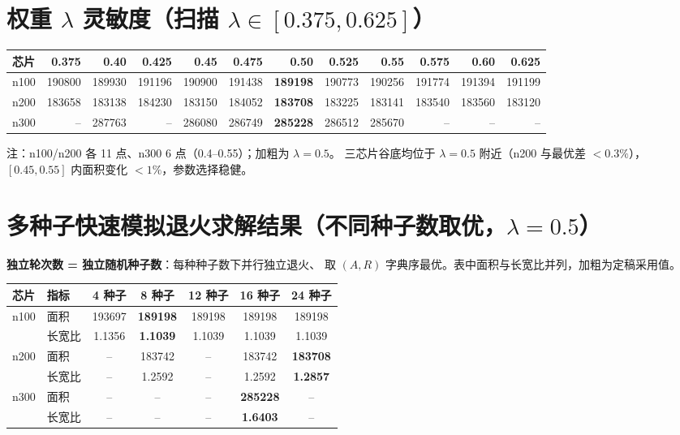 \documentclass[12pt,a4paper]{article}
\begin{document}
\section{权重 $\lambda$ 灵敏度（扫描 $\lambda\in[0.375,0.625]$）}

\begin{table}[H]
\centering
\scriptsize
\setlength{\tabcolsep}{2.5pt}
\begin{tabular}{lrrrrrrrrrrr}
\toprule
芯片 & 0.375 & 0.40 & 0.425 & 0.45 & 0.475 & 0.50 & 0.525 & 0.55 & 0.575 & 0.60 & 0.625 \\
\midrule

n100 & 190800 & 189930 & 191196 & 190900 & 191438 & \textbf{189198} & 190773 & 190256 & 191774 & 191394 & 191199 \\
n200 & 183658 & 183138 & 184230 & 183150 & 184052 & \textbf{183708} & 183225 & 183141 & 183540 & 183560 & 183120 \\
n300 & -- & 287763 & -- & 286080 & 286749 & \textbf{285228} & 286512 & 285670 & -- & -- & -- \\
\bottomrule
\end{tabular}
\end{table}

注：n100/n200 各 11 点、n300 6 点（0.4--0.55）；加粗为 $\lambda=0.5$。
三芯片谷底均位于 $\lambda=0.5$ 附近（n200 与最优差 $<0.3\%$），
$[0.45, 0.55]$ 内面积变化 $<1\%$，参数选择稳健。

\section{多种子快速模拟退火求解结果（不同种子数取优，$\lambda=0.5$）}

\textbf{独立轮次数 = 独立随机种子数}：每种种子数下并行独立退火、
取 $(A, R)$ 字典序最优。表中面积与长宽比并列，加粗为定稿采用值。

\begin{table}[H]
\centering
\scriptsize
\setlength{\tabcolsep}{3pt}
\begin{tabular}{llccccc}
\toprule
芯片 & 指标 & 4 种子 & 8 种子 & 12 种子 & 16 种子 & 24 种子 \\
\midrule
\multirow{2}{*}{n100} & 面积 & 193697 & \textbf{189198} & 189198 & 189198 & 189198 \\
 & 长宽比 & 1.1356 & \textbf{1.1039} & 1.1039 & 1.1039 & 1.1039 \\
\midrule
\multirow{2}{*}{n200} & 面积 & -- & 183742 & -- & 183742 & \textbf{183708} \\
 & 长宽比 & -- & 1.2592 & -- & 1.2592 & \textbf{1.2857} \\
\midrule
\multirow{2}{*}{n300} & 面积 & -- & -- & -- & \textbf{285228} & -- \\
 & 长宽比 & -- & -- & -- & \textbf{1.6403} & -- \\
\bottomrule
\end{tabular}
\end{table}
\end{document}
